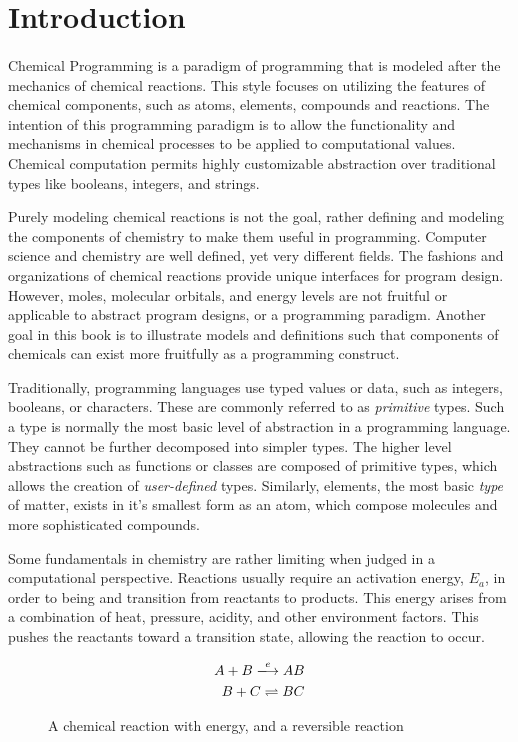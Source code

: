 
\section{Introduction}
\paragraph{   } Chemical Programming is a paradigm of programming that is modeled after the mechanics of chemical reactions. This style focuses on utilizing the features of chemical components, such as atoms, elements, compounds and reactions. The intention of this programming paradigm is to allow the functionality and mechanisms in chemical processes to be applied to computational values. Chemical computation permits highly customizable abstraction over traditional types like booleans, integers, and strings.
\par Purely modeling chemical reactions is not the goal, rather defining and modeling the components of chemistry to make them useful in programming. Computer science and chemistry are well defined, yet very different fields. The fashions and organizations of chemical reactions provide unique interfaces for program design. However, moles, molecular orbitals, and energy levels are not fruitful or applicable to abstract program designs, or a programming paradigm. Another goal in this book is to illustrate models and definitions such that components of chemicals can exist more fruitfully as a programming construct. 

\par Traditionally, programming languages use typed values or data, such as integers, booleans, or characters. These are commonly referred to as \textit{primitive} types. Such a type is normally the most basic level of abstraction in a programming language. They cannot be further decomposed into simpler types. The higher level abstractions such as functions or classes are composed of primitive types, which allows the creation of \textit{user-defined} types. Similarly, elements, the most basic \textit{type} of matter, exists in it's smallest form as an atom, which compose molecules and more sophisticated compounds.

\par Some fundamentals in chemistry are rather limiting when judged in a computational perspective. Reactions usually require an activation energy, $E_a$, in order to being and transition from reactants to products. This energy arises from a combination of heat, pressure, acidity, and other environment factors. This pushes the reactants toward a transition state, allowing the reaction to occur.  \break
\begin{figure}[h]
    \begin{align*}
          A + B \xlongrightarrow{e} AB \\
          B + C \rightleftharpoons BC
     \end{align*}
     \caption{A chemical reaction with energy, and a reversible reaction}
\end{figure}

